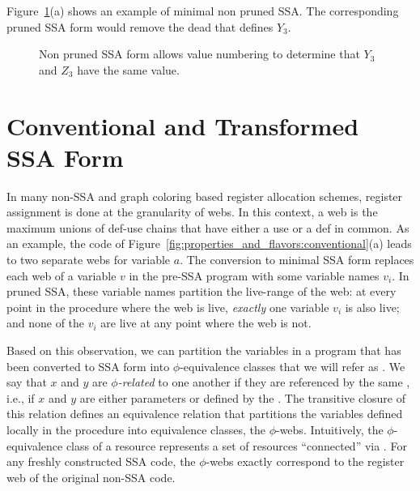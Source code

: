 Figure~\ref{fig:properties_and_flavors:pruned}(a) shows an example of minimal non pruned SSA.
The corresponding pruned SSA form would remove the dead \phifun that defines $Y_3$.

\begin{figure}
\begin{center}
\caption{Non pruned SSA form allows value numbering to determine that $Y_3$ and $Z_3$ have the same value.}
\label{fig:properties_and_flavors:pruned}
\end{center}
\end{figure}




\section{Conventional and Transformed SSA Form}
\label{sec-prop-conventional}

In many non-SSA and graph coloring based register allocation schemes, register assignment is done at the granularity of webs. In this context, a web is the maximum unions of def-use chains that have either a use or a def in common. As an example, the code of Figure~\ref{fig:properties_and_flavors:conventional}(a) leads to two separate webs for variable $a$.
The conversion to minimal SSA form replaces each web of a variable $v$ in the pre-SSA
program with some variable names $v_i$. In pruned
SSA, these variable names partition the live-range of the web: at every point in the procedure where the web is
live, \emph{exactly} one variable $v_{i}$ is also live; and none of
the $v_{i}$ are live at any point where the web is not. 


Based on this observation, we can partition the variables in a 
program that has been converted to SSA form into $\phi$-equivalence classes that we will refer as \phiwebs\index{\phiweb}. 
We say that $x$ and $y$ are \emph{$\phi$-related} to one another
if they are referenced by the same \phifun, i.e., 
if $x$ and $y$ are either parameters or defined by the \phifun. The transitive closure of this relation defines an equivalence relation that 
partitions the variables defined locally in the procedure into equivalence classes, the $\phi$-webs.
Intuitively, the $\phi$-equivalence class of a resource represents a set of resources ``connected'' via \phifuns.
For any freshly constructed SSA code, the $\phi$-webs exactly correspond to the register web of the original non-SSA code.

